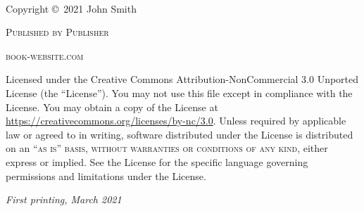 \documentclass[a4paper,12pt]{book}
\begin{document}
    \newpage
    \thispagestyle{empty}
    ~\vfill

    \noindent Copyright \copyright\ 2021 John Smith %

    \noindent \textsc{Published by Publisher} %

    \noindent \textsc{book-website.com} %

    \noindent Licensed under the Creative Commons Attribution-NonCommercial 3.0 Unported License
    (the ``License'').
    You may not use this file except in compliance with the License.
    You may obtain a copy of the License at \url{https://creativecommons.org/licenses/by-nc/3.0}.
    Unless required by applicable law or agreed to in writing, software distributed under the
    License is distributed on an \textsc{``as is'' basis, without warranties or conditions of any
    kind}, either express or implied.
    See the License for the specific language governing permissions and limitations under the
    License. %

    \noindent \textit{First printing, March 2021} %

    \pagestyle{empty} %

    \dominitoc %
    \tableofcontents %



    \pagestyle{fancy} %

    

    
\end{document}
